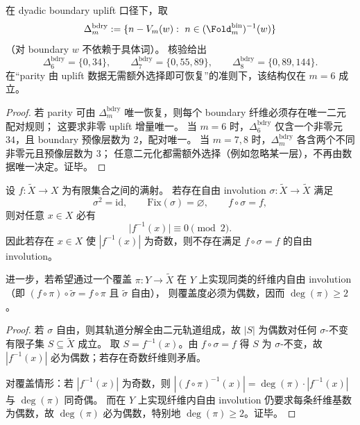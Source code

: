 \begin{proposition}[sheet parity 在 \(m=6\) 的严格锚点性]\label{prop:xi-window6-sheet-parity-anchor-m6}
在 dyadic boundary uplift 口径下，取
\[
\Delta_m^{\mathrm{bdry}}
:=\{n-V_m(w):\ n\in(\Fold_m^{\mathrm{bin}})^{-1}(w)\}
\]
（对 boundary \(w\) 不依赖于具体词）。
核验给出
\[
\Delta_6^{\mathrm{bdry}}=\{0,34\},\qquad
\Delta_7^{\mathrm{bdry}}=\{0,55,89\},\qquad
\Delta_8^{\mathrm{bdry}}=\{0,89,144\}.
\]
在“parity 由 uplift 数据无需额外选择即可恢复”的准则下，该结构仅在 \(m=6\) 成立。
\end{proposition}
\begin{proof}
若 parity 可由 \(\Delta_m^{\mathrm{bdry}}\) 唯一恢复，则每个 boundary 纤维必须存在唯一二元配对规则；
这要求非零 uplift 增量唯一。
当 \(m=6\) 时，\(\Delta_6^{\mathrm{bdry}}\) 仅含一个非零元 \(34\)，且 boundary 预像层数为 \(2\)，配对唯一。
当 \(m=7,8\) 时，\(\Delta_m^{\mathrm{bdry}}\) 各含两个不同非零元且预像层数为 \(3\)；
任意二元化都需额外选择（例如忽略某一层），不再由数据唯一决定。证毕。
\end{proof}

\begin{theorem}\label{thm:xi-bdry-free-involution-odd-fiber-obstruction-min-cover}
设 \(f:\widetilde X\to X\) 为有限集合之间的满射。
若存在自由 involution \(\sigma:\widetilde X\to\widetilde X\) 满足
\[
\sigma^2=\mathrm{id},\qquad
\mathrm{Fix}(\sigma)=\varnothing,\qquad
f\circ\sigma=f,
\]
则对任意 \(x\in X\) 必有
\[
\bigl|f^{-1}(x)\bigr|\equiv 0\pmod 2.
\]
因此若存在 \(x\in X\) 使 \(|f^{-1}(x)|\) 为奇数，则不存在满足 \(f\circ\sigma=f\) 的自由 involution。
\par
进一步，若希望通过一个覆盖 \(\pi:Y\to\widetilde X\) 在 \(Y\) 上实现同类的纤维内自由 involution（即 \((f\circ\pi)\circ\widetilde\sigma=f\circ\pi\) 且 \(\widetilde\sigma\) 自由），
则覆盖度必须为偶数，因而 \(\deg(\pi)\ge 2\)。
\end{theorem}
\begin{proof}
若 \(\sigma\) 自由，则其轨道分解全由二元轨道组成，故 \(|S|\) 为偶数对任何 \(\sigma\)-不变有限子集 \(S\subseteq \widetilde X\) 成立。
取 \(S=f^{-1}(x)\)。由 \(f\circ\sigma=f\) 得 \(S\) 为 \(\sigma\)-不变，故 \(|f^{-1}(x)|\) 必为偶数；若存在奇数纤维则矛盾。
\par
对覆盖情形：若 \(|f^{-1}(x)|\) 为奇数，则 \(|(f\circ\pi)^{-1}(x)|=\deg(\pi)\cdot |f^{-1}(x)|\) 与 \(\deg(\pi)\) 同奇偶。
而在 \(Y\) 上实现纤维内自由 involution 仍要求每条纤维基数为偶数，故 \(\deg(\pi)\) 必为偶数，特别地 \(\deg(\pi)\ge 2\)。证毕。
\end{proof}

